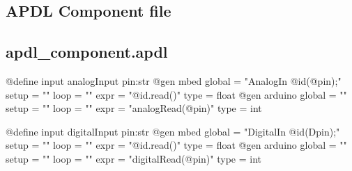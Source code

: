\begin{appendices}
\chapter{APDL Component file}
\label{app:apdl_component_apdl}

\section*{apdl\_component.apdl}
\begin{apdlcode}
@define input analogInput pin:str {
    @gen mbed {
        global = "AnalogIn @id(@pin);"
        setup = ""
        loop = ""
        expr = "@id.read()"
        type = float
    }
    @gen arduino {
        global = ""
        setup = ""
        loop = ""
        expr = "analogRead(@pin)"
        type = int
    }
}

@define input digitalInput pin:str {
    @gen mbed {
        global = "DigitalIn @id(Dpin);"
        setup = ""
        loop = ""
        expr = "@id.read()"
        type = float
    }
    @gen arduino {
        global = ""
        setup = ""
        loop = ""
        expr = "digitalRead(@pin)"
        type = int
    }
}
\end{apdlcode}

\end{appendices}
